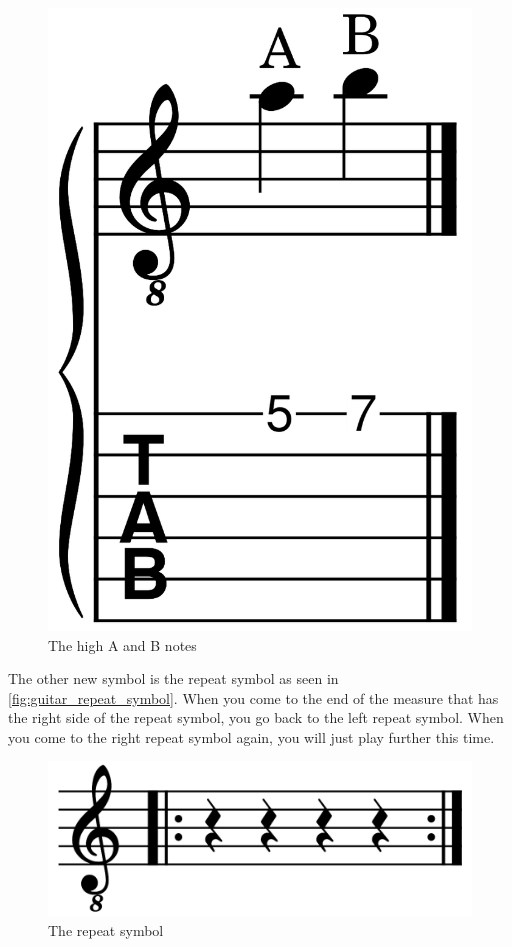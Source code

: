 \begin{figure}[h]
	\centering
	\includegraphics[height=0.12\textheight]{../../MuseScore/Guitar/GuitarNotesHighAB.png}
	\caption{The high A and B notes}
	\label{fig:guitar_notes_high_a_b}
\end{figure}

The other new symbol is the repeat symbol as seen in \autoref{fig:guitar_repeat_symbol}. When you come to the end of the measure that has the right side of the repeat symbol, you go back to the left repeat symbol. When you come to the right repeat symbol again, you will just play further this time.

\begin{figure}[h]
	\centering
	\includegraphics[height=0.05\textheight]{../../MuseScore/Guitar/GuitarRepeatSymbol.png}
	\caption{The repeat symbol}
	\label{fig:guitar_repeat_symbol}
\end{figure}

